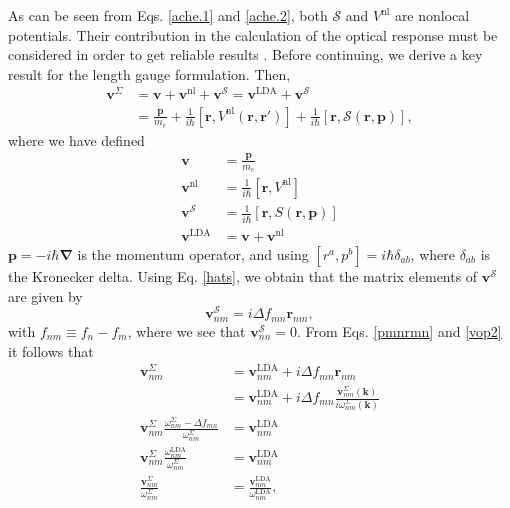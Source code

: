 As can be seen from Eqs. \eqref{ache.1} and \eqref{ache.2}, both $\mathcal{S}$
and $V^{\mathrm{nl}}$ are nonlocal potentials. Their contribution in the
calculation of the optical response must be considered in order to get reliable
results \cite{ismailPRL01}. Before continuing, we derive a key result for the
length gauge formulation. Then,
\begin{equation}\label{vop2}
\begin{split}
\mathbf{v}^{\Sigma}
&=\mathbf{v} + \mathbf{v}^{\mathrm{nl}} 
+ \mathbf{v}^{\mathcal{S}}
= \mathbf{v}^\mathrm{LDA} + \mathbf{v}^{\mathcal{S}}\\
&=\frac{\mathbf{p}}{m_{e}} + \frac{1}{i\hbar}
  \left[\mathbf{r},V^{\mathrm{nl}}(\mathbf{r},\mathbf{r}')\right]
+ \frac{1}{i\hbar}
  \left[\mathbf{r},\mathcal{S}(\mathbf{r},\mathbf{p})\right],
\end{split}
\end{equation}
where we have defined
\begin{equation}\label{conhr}
\begin{split}
\mathbf{v} &=\frac{\mathbf{p}}{m_{e}}\\
\mathbf{v}^{\mathrm{nl}} &= \frac{1}{i\hbar}
  \left[\mathbf{r},V^{\mathrm{nl}}\right]\\
\mathbf{v}^{\mathcal{S}} &= \frac{1}{i\hbar}
  \left[\mathbf{r},S(\mathbf{r},\mathbf{p})\right]\\
\mathbf{v}^\mathrm{LDA} &= \mathbf{v}+\mathbf{v}^{\mathrm{nl}}
\end{split}
\end{equation}  
$\mathbf{p}= -i\hbar\boldsymbol{\nabla}$ is the momentum operator, and
using $[r^a,p^b]=i\hbar\delta_{ab}$, where $\delta_{ab}$ is the Kronecker
delta. Using Eq. \eqref{hats}, we obtain that the matrix elements of
$\mathbf{v}^{\mathcal{S}}$ are given by
\begin{equation}\label{chon.2} 
\mathbf{v}^{\mathcal{S}}_{nm} = i\Delta f_{mn}\mathbf{r}_{nm},
\end{equation}
with $f_{nm} \equiv f_{n} - f_{m}$, where we see that
$\mathbf{v}^{\mathcal{S}}_{nn} = 0$. From Eqs. \eqref{pmnrmn} and \eqref{vop2}
it follows that
\begin{align}\label{chon.8}
\mathbf{v}^\Sigma_{nm} 
&= \mathbf{v}^\mathrm{LDA}_{nm} + i\Delta f_{mn}\mathbf{r}_{nm}\nonumber\\
&= \mathbf{v}^\mathrm{LDA}_{nm} + i\Delta f_{mn}
   \frac{\mathbf{v}^\Sigma_{nm}(\mathbf{k})}{i\omega^\Sigma_{nm}(\mathbf{k})}
   \nonumber\\
\mathbf{v}^\Sigma_{nm}
  \frac{\omega^\Sigma_{nm}-\Delta f_{mn}}{\omega^\Sigma_{nm}}
&= \mathbf{v}^\mathrm{LDA}_{nm}\nonumber\\
\mathbf{v}^\Sigma_{nm}\frac{\omega^{\mathrm{LDA}}_{nm}}{\omega^\Sigma_{nm}}
&= \mathbf{v}^\mathrm{LDA}_{nm}\nonumber\\
\frac{\mathbf{v}^\Sigma_{nm}}{\omega^\Sigma_{nm}}
&= \frac{\mathbf{v}^\mathrm{LDA}_{nm}}{\omega^{\mathrm{LDA}}_{nm}},
\end{align}
